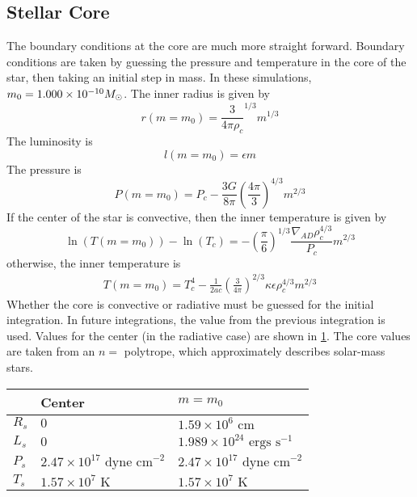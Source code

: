 \documentclass[10pt]{article}
\renewcommand{\ll}{\left} %
\newcommand{\rr}{\right} %
\newcommand{\txt}{\textrm} %
\newcommand{\unit}[1]{\txt{ #1}} %
\newcommand{\E}[1]{\times 10^{#1}} %
\begin{document}
\subsection{Stellar Core}
The boundary conditions at the core are much more straight forward. Boundary conditions are taken by guessing the pressure and temperature in the core of the star, then taking an initial step in mass. In these simulations, $m_0 = 1.000 \times 10^{-10}M_\odot$. The inner radius is given by
\begin{equation}
r(m=m_0) = \frac{3}{4\pi \rho_c}^{1/3} m^{1/3}
\end{equation}
The luminosity is
\begin{equation}
l(m=m_0) = \epsilon m
\end{equation}
The pressure is
\begin{equation}
P(m=m_0) = P_c - \frac{3 G}{8 \pi} \left(\frac{4 \pi}{3}\right)^{4/3} m^{2/3}
\end{equation}
If the center of the star is convective, then the inner temperature is given by
\begin{equation}
\ln(T(m=m_0))-\ln(T_c) = - \left( \frac{\pi}{6} \right)^{1/3} \frac{\nabla_{AD} \rho_c^{4/3}}{P_c} m^{2/3}
\end{equation}
otherwise, the inner temperature is
\begin{align}
T(m=m_0) = T_c^4 - \frac{1}{2ac} \ll(\frac{3}{4 \pi}\rr)^{2/3} \kappa \epsilon \rho_c^{4/3} m^{2/3}
\end{align}
Whether the core is convective or radiative must be guessed for the initial integration. In future integrations, the value from the previous integration is used. Values for the center (in the radiative case) are shown in \cref{tab:center}. The core values are taken from an $n=$ polytrope, which approximately describes solar-mass stars.

\begin{table}[htbp]
   \centering
   \begin{tabular}{@{} l|l|l @{}} 
   & Center & $m=m_0$ \\ \hline \hline
   $R_s$ & $0$ & $1.59\E{6} \unit{cm}$ \\
   $L_s$ & $0$ &  $1.989\E{24} \unit{ergs s}^{-1}$\\
   $P_s$ & $2.47\E{17} \unit{dyne cm}^{-2}$ & $2.47\E{17} \unit{dyne cm}^{-2}$ \\
   $T_s$ & $1.57\E{7} \unit{K}$ & $1.57\E{7} \unit{K}$
   \end{tabular}
   \label{tab:center}
\end{table}
\end{document}
